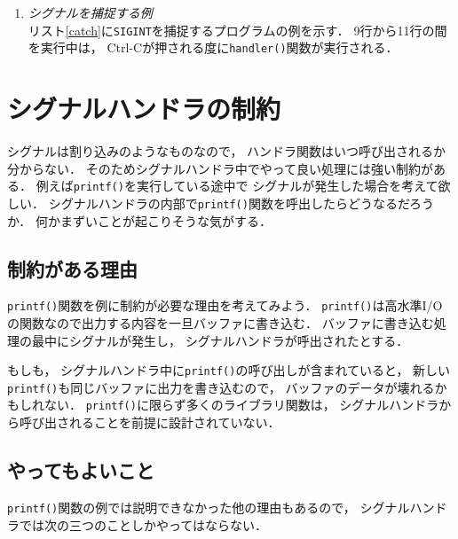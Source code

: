 \begin{description}
\begin{enumerate}
    
    
  \item \emph{シグナルを捕捉する例} \\
    リスト\ref{catch}に\texttt{SIGINT}を捕捉するプログラムの例を示す．
    9行から11行の間を実行中は，
    Ctrl-Cが押される度に\texttt{handler()}関数が実行される．
  
    
  \end{enumerate}

\end{description}

\section{シグナルハンドラの制約}
シグナルは割り込みのようなものなので，
ハンドラ関数はいつ呼び出されるか分からない．
そのためシグナルハンドラ中でやって良い処理には強い制約がある．
例えば\texttt{printf()}を実行している途中で
シグナルが発生した場合を考えて欲しい．
シグナルハンドラの内部で\texttt{printf()}関数を呼出したらどうなるだろうか．
何かまずいことが起こりそうな気がする．

\subsection{制約がある理由}
\texttt{printf()}関数を例に制約が必要な理由を考えてみよう．
\texttt{printf()}は高水準I/Oの関数なので出力する内容を一旦バッファに書き込む．
バッファに書き込む処理の最中にシグナルが発生し，
シグナルハンドラが呼出されたとする．

もしも，
シグナルハンドラ中に\texttt{printf()}の呼び出しが含まれていると，
新しい\texttt{printf()}も同じバッファに出力を書き込むので，
バッファのデータが壊れるかもしれない．
\texttt{printf()}に限らず多くのライブラリ関数は，
シグナルハンドラから呼び出されることを前提に設計されていない．

\subsection{やってもよいこと}
\texttt{printf()}関数の例では説明できなかった他の理由もあるので，
シグナルハンドラでは次の三つのことしかやってはならない．

